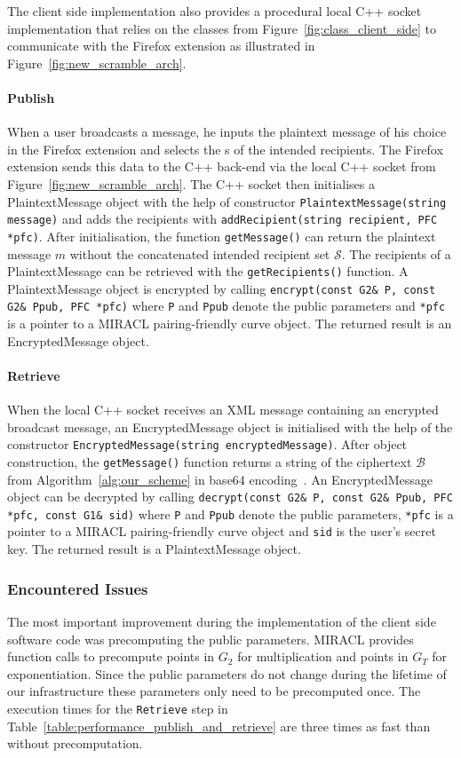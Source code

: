 The client side implementation also provides a procedural local C++ socket implementation that relies on the classes from Figure~\ref{fig:class_client_side} to communicate with the Firefox extension as illustrated in Figure~\ref{fig:new_scramble_arch}.

\paragraph{Publish}
When a user broadcasts a message, he inputs the plaintext message of his choice in the Firefox extension and selects the \id{}s of the intended recipients. The Firefox extension sends this data to the C++ back-end via the local C++ socket from Figure~\ref{fig:new_scramble_arch}. The C++ socket then initialises a PlaintextMessage object with the help of constructor \texttt{PlaintextMessage(string message)} and adds the recipients with \texttt{addRecipient(string recipient, PFC *pfc)}. After initialisation, the function \texttt{getMessage()} can return the plaintext message $m$ without the concatenated intended recipient set $\mathcal{S}$. The recipients of a PlaintextMessage can be retrieved with the \texttt{getRecipients()} function. A PlaintextMessage object is encrypted by calling \texttt{encrypt(const G2\& P, const G2\& Ppub, PFC *pfc)} where \texttt{P} and \texttt{Ppub} denote the public parameters and \texttt{*pfc} is a pointer to a MIRACL pairing-friendly curve object. The returned result is an EncryptedMessage object.


\paragraph{Retrieve}
When the local C++ socket receives an XML message containing an encrypted broadcast message, an EncryptedMessage object is initialised with the help of the constructor \texttt{EncryptedMessage(string encryptedMessage)}. After object construction, the \texttt{getMessage()} function returns a string of the ciphertext $\mathcal{B}$ from Algorithm~\ref{alg:our_scheme} in base64 encoding~\cite{rfc4648}. An EncryptedMessage object can be decrypted by calling \texttt{decrypt(const G2\& P, const G2\& Ppub, PFC *pfc, const G1\& s\textunderscore id)} where \texttt{P} and \texttt{Ppub} denote the public parameters, \texttt{*pfc} is a pointer to a MIRACL pairing-friendly curve object and \texttt{s\textunderscore id} is the user's secret key. The returned result is a PlaintextMessage object.

\subsubsection{Encountered Issues}
The most important improvement during the implementation of the client side software code was precomputing the public parameters. MIRACL provides function calls to precompute points in $G_2$ for multiplication and points in $G_T$ for exponentiation. Since the public parameters do not change during the lifetime of our infrastructure these parameters only need to be precomputed once. The execution times for the \texttt{Retrieve} step in Table~\ref{table:performance_publish_and_retrieve} are three times as fast than without precomputation.


